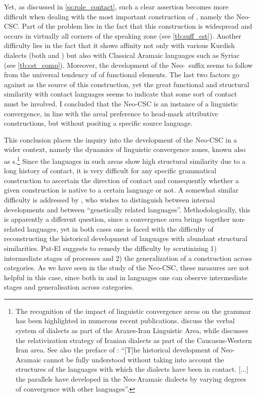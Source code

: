 Yet, as discussed in \ref{ss:role_contact}, such a clear assertion becomes more difficult when dealing with the most important construction of , namely the Neo-CSC. Part of the problem lies in the fact that this construction is widespread and occurs  in virtually all corners of the  speaking zone (see \vref{tb:suff_cst}). Another difficulty lies in the fact that it shows affinity not only  with various Kurdish dialects (both \Sor and \Kur) but also with Classical Aramaic languages such as Syriac (see \vref{tb:cst_comp}). Moreover, the development of the Neo-\cst\ suffix seems to follow from the universal tendency of  of functional elements. The last two factors go against  as the source of this construction, yet the great functional and structural similarity with contact languages seems to indicate that some sort of contact must be involved. I concluded that the Neo-CSC is an instance of a linguistic convergence, in line with the areal preference to head-mark attributive constructions, but without positing a specific source language.

This conclusion places the inquiry into the development of the Neo-CSC in a wider context, namely the dynamics of linguistic convergence zones, known also as s.\footnote{The recognition of the impact of linguistic convergence areas on the  grammar has been highlighted in numerous recent publications. \citet{NoorlanderStilo} discuss the verbal system of  dialects as part of the Araxes-Iran Linguistic Area, while \citet{Gandon} discusses the relativization strategy of Iranian  dialects as part of the Caucasus-Western Iran area. See also the preface of \citet[VII]{KhanNapiorkowska}: \enquote{[T]he historical development of Neo-Aramaic cannot be fully understood without taking into account the structures of the languages with which the dialects have been in contact. [...] the parallels have developed in the Neo-Aramaic dialects by varying degrees of convergence with other languages}.}
 Since the languages in such areas show high structural similarity due to a  long history of contact, it is very difficult for any specific grammatical construction to ascertain the direction of contact and consequently whether a given construction is native to a certain language or not.  A somewhat similar difficulty is addressed by \citet{PatElContact}, who wishes to distinguish between internal developments and  between \enquote{genetically related languages}. Methodologically, this is apparently a different question, since a convergence area brings together non-related languages, yet in both cases one is faced with the difficulty of reconstructing the historical development of languages with abundant structural similarities. Pat-El suggests to remedy the difficulty by scrutinizing 1) intermediate stages of  processes and 2) the generalization of a construction across categories. As we have seen in the study of the Neo-CSC, these measures are not helpful in this case, since both in  and in  languages one can observe intermediate stages and generalisation across categories. 


